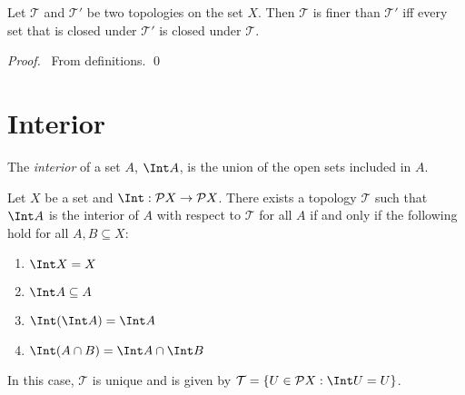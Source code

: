 \begin{prop}
  Let $\mathcal{T}$ and $\mathcal{T}'$ be two topologies on the set $X$. Then $\mathcal{T}$ is finer than $\mathcal{T}'$ iff every set that is closed under $\mathcal{T}'$ is closed under $\mathcal{T}$.
\end{prop}

\begin{proof}
  \pf\ From definitions. \qed
\end{proof}

\section{Interior}

\begin{df}[Interior]
  The \emph{interior} of a set $A$, $\Int A$, is the union of the open sets included in $A$.
\end{df}

\begin{prop}
  \label{prop:interior}
Let $X$ be a set and $\Int : \mathcal{P} X \rightarrow \mathcal{P} X$. There exists a topology $\mathcal{T}$ such that
$\Int A$ is the interior of $A$ with respect to $\mathcal{T}$ for all $A$ if and only if the following hold for all $A, B \subseteq X$:
\begin{enumerate}
  \item
  $\Int X = X$
  \item
  $\Int A \subseteq A$
  \item
  $\Int (\Int A) = \Int A$
  \item
  $\Int (A \cap B) = \Int A \cap \Int B$
\end{enumerate}
In this case, $\mathcal{T}$ is unique and is given by $\mathcal{T} = \{ U \in \mathcal{P} X : \Int U = U \}$.
\end{prop}


